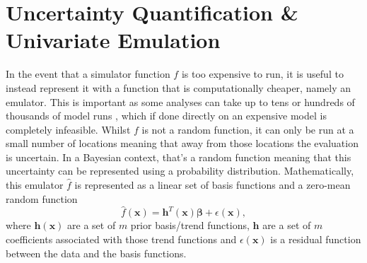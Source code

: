 \documentclass{article}
\newcommand{\simulator}{f}
\newcommand{\emulator}{\hat{f}}
\newcommand{\inputVec}{\mathbf{x}}
\newcommand{\basisFuncs}{\mathbf{h}}
\newcommand{\basisCoeffs}{\mathbf{\beta}}
\newcommand{\numBasisFuncs}{m}
\newcommand{\residual}{\epsilon}
\begin{document}
\section{Uncertainty Quantification \& Univariate Emulation}
\label{section:emulation}
In the event that a simulator function $\simulator$ is too expensive to run, it is useful to instead represent it with a function that is computationally cheaper, namely an emulator. This is important as some analyses can take up to tens or hundreds of thousands of model runs \citep{Tripathy2016}, which if done directly on an expensive model is completely infeasible. Whilst $\simulator$ is not a random function, it can only be run at a small number of locations meaning that away from those locations the evaluation is uncertain. In a Bayesian context, that's a random function meaning that this uncertainty can be represented using a probability distribution. Mathematically, this emulator $\emulator$ is represented as a linear set of basis functions and a zero-mean random function
\begin{equation}
    \label{eq:emulator}
    \emulator(\inputVec) = \basisFuncs^T (\inputVec) \basisCoeffs + \residual(\inputVec),
\end{equation}
where $\basisFuncs (\inputVec)$ are a set of $\numBasisFuncs$ prior basis/trend functions, $\basisFuncs$ are a set of $\numBasisFuncs$ coefficients associated with those trend functions and $\residual(\inputVec)$ is a residual function between the data and the basis functions.
\end{document}
